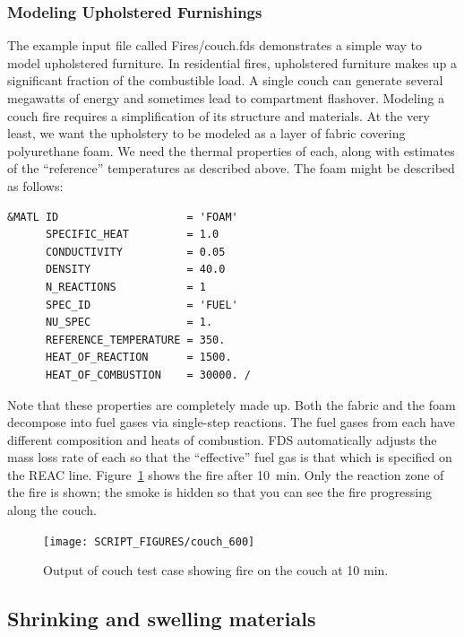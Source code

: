 \documentclass[11pt]{book}
\begin{document}
\subsubsection{Modeling Upholstered Furnishings}

The example input file called {\ct Fires/couch.fds} demonstrates a simple way to model upholstered furniture. In residential fires, upholstered furniture makes up a significant fraction of the combustible load. A single couch can generate several megawatts of energy and sometimes lead to compartment flashover. Modeling a couch fire requires a simplification of its structure and materials.  At the very least, we want the upholstery to be modeled as a layer of fabric covering polyurethane foam. We need the thermal properties of each, along with estimates of the ``reference'' temperatures as described above. The foam might be described as follows:
\begin{lstlisting}
&MATL ID                    = 'FOAM'
      SPECIFIC_HEAT         = 1.0
      CONDUCTIVITY          = 0.05
      DENSITY               = 40.0
      N_REACTIONS           = 1
      SPEC_ID               = 'FUEL'
      NU_SPEC               = 1.
      REFERENCE_TEMPERATURE = 350.
      HEAT_OF_REACTION      = 1500.
      HEAT_OF_COMBUSTION    = 30000. /
\end{lstlisting}
Note that these properties are completely made up.  Both the fabric and the foam decompose into fuel gases via single-step reactions. The fuel gases from each have different composition and heats of combustion. FDS automatically adjusts the mass loss rate of each so that the ``effective'' fuel gas is that which is specified on the {\ct REAC} line.  Figure~\ref{couch} shows the fire after 10~min.  Only the reaction zone of the fire is shown; the smoke is hidden so that you can see the fire progressing along the couch.

\begin{figure}[ht]
\texttt{[image: SCRIPT\_FIGURES/couch\_600]}
\caption[Results of the {\ct couch} test case]{Output of {\ct couch} test case showing fire on the couch at 10 min.}
\label{couch}
\end{figure}


\subsection{Shrinking and swelling materials}
\label{info:shrink_swell}
\end{document}
